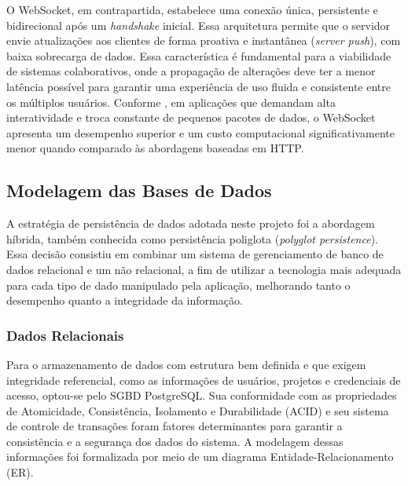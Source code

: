 O WebSocket, em contrapartida, estabelece uma conexão única, persistente e bidirecional  após um \textit{handshake} inicial. Essa arquitetura permite que o servidor envie atualizações aos clientes de forma proativa e instantânea (\textit{server push}), com baixa sobrecarga de dados. Essa característica é fundamental para a viabilidade de sistemas colaborativos, onde a propagação de alterações deve ter a menor latência possível para garantir uma experiência de uso fluida e consistente entre os múltiplos usuários. Conforme , em aplicações que demandam alta interatividade e troca constante de pequenos pacotes de dados, o WebSocket apresenta um desempenho superior e um custo computacional significativamente menor quando comparado às abordagens baseadas em HTTP.

\subsection[Modelagem das Bases de Dados]{Modelagem das Bases de Dados}
A estratégia de persistência de dados adotada neste projeto foi a abordagem híbrida, também conhecida como persistência poliglota (\textit{polyglot persistence}). Essa decisão consistiu em combinar um sistema de gerenciamento de banco de dados relacional e um não relacional, a fim de utilizar a tecnologia mais adequada para cada tipo de dado manipulado pela aplicação, melhorando tanto o desempenho quanto a integridade da informação.

\subsubsection[Dados Relacionais]{Dados Relacionais}
%
%
Para o armazenamento de dados com estrutura bem definida e que exigem integridade referencial, como as informações de usuários, projetos e credenciais de acesso, optou-se pelo SGBD PostgreSQL. Sua conformidade com as propriedades de Atomicidade, Consistência, Isolamento e Durabilidade (ACID) e seu sistema de controle de transações foram fatores determinantes para garantir a consistência e a segurança dos dados do sistema. A modelagem dessas informações foi formalizada por meio de um diagrama Entidade-Relacionamento (ER).

